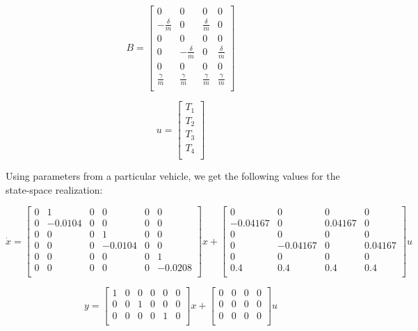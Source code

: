 \documentclass{article}
\begin{document}
\[
B = 
\begin{bmatrix}
0 & 0 & 0 & 0 \\
-\frac{\delta}{m} & 0 & \frac{\delta}{m} & 0 \\
0 & 0 & 0 & 0 \\
0 & -\frac{\delta}{m} & 0 & \frac{\delta}{m} \\
0 & 0 & 0 & 0 \\
\frac{\gamma}{m} & \frac{\gamma}{m} & \frac{\gamma}{m} & \frac{\gamma}{m} \\
\end{bmatrix}
\]

\[
u = 
\begin{bmatrix}
T_1 \\
T_2 \\
T_3 \\
T_4 \\
\end{bmatrix}
\]

Using parameters from a particular vehicle, we get the following values for the state-space realization:

\[
\dot{x} = 
\begin{bmatrix}
0 & 1 & 0 & 0 & 0 & 0 \\
0 & -0.0104 & 0 & 0 & 0 & 0 \\
0 & 0 & 0 & 1 & 0 & 0 \\
0 & 0 & 0 & -0.0104 & 0 & 0 \\
0 & 0 & 0 & 0 & 0 & 1 \\
0 & 0 & 0 & 0 & 0 & -0.0208 \\
\end{bmatrix}
x +
\begin{bmatrix}
0 & 0 & 0 & 0 \\
-0.04167 & 0 & 0.04167 & 0 \\
0 & 0 & 0 & 0 \\
0 & -0.04167 & 0 & 0.04167 \\
0 & 0 & 0 & 0 \\
0.4 & 0.4 & 0.4 & 0.4 \\
\end{bmatrix}
u
\]

\[
y = 
\begin{bmatrix}
1 & 0 & 0 & 0 & 0 & 0 \\
0 & 0 & 1 & 0 & 0 & 0 \\
0 & 0 & 0 & 0 & 1 & 0 \\
\end{bmatrix}
x +
\begin{bmatrix}
0 & 0 & 0 & 0 \\
0 & 0 & 0 & 0 \\
0 & 0 & 0 & 0 \\
\end{bmatrix}
u
\]
\end{document}
